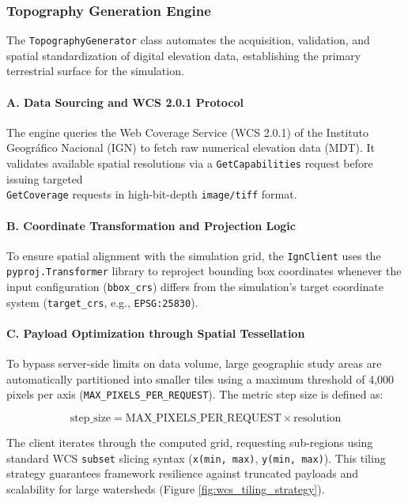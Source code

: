 \subsubsection{Topography Generation Engine}

The \texttt{TopographyGenerator} class automates the acquisition, validation, and spatial standardization of digital elevation data, establishing the primary terrestrial surface for the simulation.

\paragraph{A. Data Sourcing and WCS 2.0.1 Protocol}
The engine queries the Web Coverage Service (WCS 2.0.1) of the Instituto Geográfico Nacional (IGN) to fetch raw numerical elevation data (MDT). It validates available spatial resolutions via a \texttt{GetCapabilities} request before issuing targeted \\ \texttt{GetCoverage} requests in high-bit-depth \texttt{image/tiff} format.

\paragraph{B. Coordinate Transformation and Projection Logic}
To ensure spatial alignment with the simulation grid, the \texttt{IgnClient} uses the \\ \texttt{pyproj.Transformer} library to reproject bounding box coordinates whenever the input configuration (\texttt{bbox\_crs}) differs from the simulation's target coordinate system (\texttt{target\_crs}, e.g., \texttt{EPSG:25830}).

\paragraph{C. Payload Optimization through Spatial Tessellation}
To bypass server-side limits on data volume, large geographic study areas are automatically partitioned into smaller tiles using a maximum threshold of 4,000 pixels per axis (\texttt{MAX\_PIXELS\_PER\_REQUEST}). The metric step size is defined as:

\begin{equation}
    \text{step\_size} = \text{MAX\_PIXELS\_PER\_REQUEST} \times \text{resolution}
\end{equation}

The client iterates through the computed grid, requesting sub-regions using standard WCS \texttt{subset} slicing syntax (\texttt{x(min, max)}, \texttt{y(min, max)}). This tiling strategy guarantees framework resilience against truncated payloads and scalability for large watersheds (Figure \ref{fig:wcs_tiling_strategy}).


